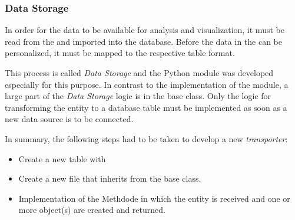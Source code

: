 \subsubsection{Data Storage}
\label{subsubsec:storage}
In order for the data to be available for analysis and visualization, it must be read from the \gds{} and imported into the \pg{} database.
Before the data in the \pg{} can be personalized, it must be mapped to the respective table format.

This process is called \textit{Data Storage} and the Python module  was developed especially for this purpose.
In contrast to the implementation of the  module, a large part of the \textit{Data Storage} logic is in the base class.
Only the logic for transforming the \gds{} entity to a \pg{} database table must be implemented as soon as a new
data source is to be connected.

In summary, the following steps had to be taken to develop a new \textit{transporter}:
\begin{itemize}
  \item Create a new \pg{} table with 
  \item  Create a new  file that inherits from the base class.
  \item Implementation of the  Methdode in which the \gds{} entity is received and one or more  object(s) are created and returned.
\end{itemize}
